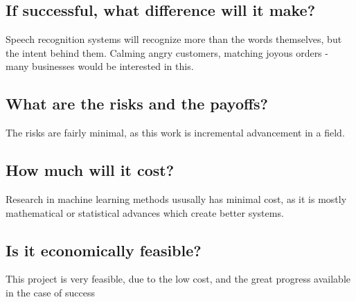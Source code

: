 \documentclass[9pt]{article}
\begin{document}
\subsection*{If successful, what difference will it make?}
Speech recognition systems will recognize more than the words themselves, but the intent behind them. Calming angry customers, 
matching joyous orders - many businesses would be interested in this.
\subsection*{What are the risks and the payoffs?}
The risks are fairly minimal, as this work is incremental advancement in a field. 
\subsection*{How much will it cost?}
Research in machine learning methods ususally has minimal cost, as it is mostly mathematical or statistical advances which 
create better systems.
\subsection*{Is it economically feasible?}
This project is very feasible, due to the low cost, and the great progress available in the case of success
\end{document}
